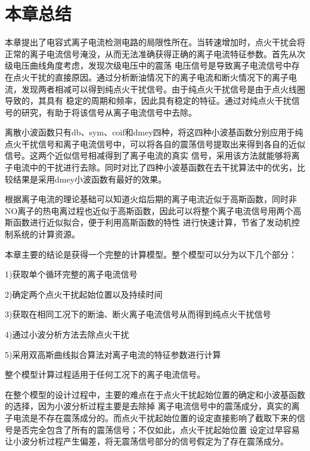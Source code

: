 \section{本章总结}
本章提出了电容式离子电流检测电路的局限性所在。当转速增加时，点火干扰会将正常的离子电流信号淹没，从而无法准确获得正确的离子电流特征参数。首先从次级电压曲线角度考虑，发现次级电压中的震荡
电压信号是导致离子电流信号中存在点火干扰的直接原因。通过分析断油情况下的离子电流和断火情况下的离子电流，发现两者相减可以得到纯点火干扰信号。由于纯点火干扰信号是由于点火线圈导致的，其具有
稳定的周期和频率，因此具有稳定的特征。通过对纯点火干扰信号的研究，有助于将该信号从离子电流信号中去除。\par
离散小波函数只有db、sym、coif和dmey四种，将这四种小波基函数分别应用于纯点火干扰信号和离子电流信号中，可以将各自的震荡信号提取出来得到各自的近似信号。这两个近似信号相减得到了离子电流的真实
信号，采用该方法就能够将离子电流中的干扰进行去除。同时对比了四种小波基函数在去干扰算法中的优劣，比较结果是采用dmey小波函数有最好的效果。\par
根据离子电流的理论基础可以知道火焰后期的离子电流近似于高斯函数，同时非NO离子的热电离过程也近似于高斯函数，因此可以将整个离子电流信号用两个高斯函数进行近似拟合，便于利用高斯函数的特性
进行快速计算，节省了发动机控制系统的计算资源。\par
本章主要的结论是获得一个完整的计算模型。整个模型可以分为以下几个部分：\par
1)获取单个循环完整的离子电流信号\par
2)确定两个点火干扰起始位置以及持续时间\par
3)获取在相同工况下的断油、断火离子电流信号从而得到纯点火干扰信号\par
4)通过小波分析方法去除点火干扰\par
5)采用双高斯曲线拟合算法对离子电流的特征参数进行计算\par
整个模型计算过程适用于任何工况下的离子电流信号。\par
在整个模型的设计过程中，主要的难点在于点火干扰起始位置的确定和小波基函数的选择，因为小波分析过程主要是去除掉
离子电流信号中的震荡成分，真实的离子电流是不存在震荡成分的。而点火干扰起始位置的设定直接影响了截取下来的信号是否完全包含了所有的震荡信号；不仅如此，点火干扰起始位置
设定过早容易让小波分析过程产生偏差，将无震荡信号部分的信号假定为了存在震荡成分。\par